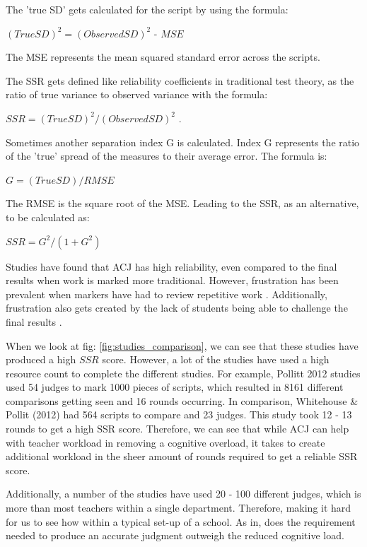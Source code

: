 	The 'true SD' gets calculated for the script by using the formula:
		\begin{center}
			$(True SD)^{2} = (Observed SD)^{2} \text{ - } MSE$
		\end{center}
	 
	The MSE represents the mean squared standard error across the scripts. 
	
	The SSR gets defined like reliability coefficients in traditional test theory, as the ratio of true variance to observed variance with the formula: 
	\begin{center}
		
	$SSR = (True SD)^{2} / (Observed SD)^{2}$ .
	\end{center}
	Sometimes another separation index G is calculated. Index G represents the ratio of the 'true' spread of the measures to their average error. The formula is: 
	\begin{center}
		$G = (True SD) / RMSE$
	\end{center}
	The RMSE is the square root of the MSE. Leading to the SSR, as an alternative, to be calculated as:
	\begin{center}
		$SSR = G^2 / (1+G^2 )$
	\end{center}

	Studies have found that ACJ has high reliability, even compared to the final results when work is marked more traditional. However,  frustration has been prevalent when markers have had to review repetitive work \cite{bartholomew2019tool}. Additionally, frustration also gets created by the lack of students being able to challenge the final results \cite{bartholomew2019tool}. 
	
	When we look at fig: \ref{fig:studies_comparison}, we can see that these studies have produced a high $SSR$ score. However, a lot of the studies have used a high resource count to complete the different studies. For example, Pollitt 2012 studies used 54 judges to mark 1000 pieces of scripts, which resulted in 8161 different comparisons getting seen and 16 rounds occurring. In comparison, Whitehouse \& Pollit (2012) had 564 scripts to compare and 23 judges. This study took 12 - 13 rounds to get a high SSR score. Therefore, we can see that while ACJ can help with teacher workload in removing a cognitive overload, it takes to create additional workload in the sheer amount of rounds required to get a reliable SSR score.
	
	Additionally, a number of the studies have used 20 - 100 different judges, which is more than most teachers within a single department. Therefore, making it hard for us to see how within a typical set-up of a school. As in, does the requirement needed to produce an accurate judgment outweigh the reduced cognitive load. 
	
